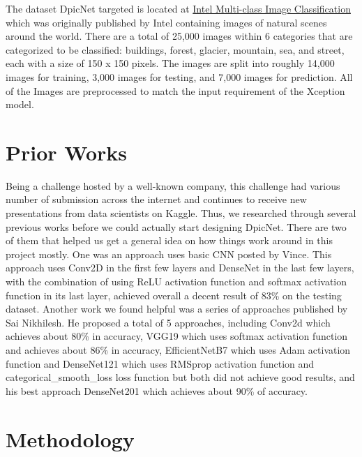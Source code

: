 \documentclass{article}
\begin{document}
The dataset DpicNet targeted is located at \href{https://www.kaggle.com/puneet6060/intel-image-classification}{Intel Multi-class Image Classification} which was originally published by Intel  containing images of natural scenes around the world. There are a total of 25,000 images within 6 categories that are categorized to be classified: buildings, forest, glacier, mountain, sea, and street, each with a size of 150 x 150 pixels. The images are split into roughly 14,000 images for training, 3,000 images for testing, and 7,000 images for prediction. All of the Images are preprocessed to match the input requirement of the Xception model.


\section{Prior Works}

Being a challenge hosted by a well-known company, this challenge had various number of submission across the internet and continues to receive new presentations from data scientists on Kaggle. Thus, we researched through several previous works before we could actually start designing DpicNet. There are two of them that helped us get a general idea on how things work around in this project mostly. One was an approach uses basic CNN posted by Vince. This approach uses Conv2D in the first few layers and DenseNet in the last few layers, with the combination of using ReLU activation function and softmax activation function in its last layer, achieved overall a decent result of 83\% on the testing dataset. Another work we found helpful was a series of approaches published by Sai Nikhilesh. He proposed a total of 5 approaches, including Conv2d which achieves about 80\% in accuracy, VGG19 which uses softmax activation function and achieves about 86\% in accuracy, EfficientNetB7 which uses Adam activation function and DenseNet121 which uses RMSprop activation function and categorical\_smooth\_loss loss function but both did not achieve good results, and his best approach DenseNet201 which achieves about 90\% of accuracy.


\section {Methodology}
\end{document}
